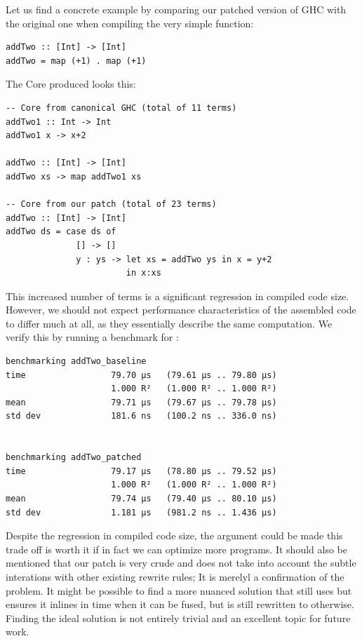 Let us find a concrete example by comparing our patched version of GHC with the original one when compiling the very simple function:

\begin{listing}[H]
\begin{verbatim}
addTwo :: [Int] -> [Int]
addTwo = map (+1) . map (+1)
\end{verbatim}
\end{listing}

The Core produced looks this:

\begin{listing}[H]
\begin{verbatim}
-- Core from canonical GHC (total of 11 terms)
addTwo1 :: Int -> Int
addTwo1 x -> x+2

addTwo :: [Int] -> [Int]
addTwo xs -> map addTwo1 xs

-- Core from our patch (total of 23 terms)
addTwo :: [Int] -> [Int]
addTwo ds = case ds of
              [] -> []
              y : ys -> let xs = addTwo ys in x = y+2
                        in x:xs
\end{verbatim}
\end{listing}

This increased number of terms is a significant regression in compiled code size. 
However, we should not expect performance characteristics of the assembled code to differ much at all,
as they essentially describe the same computation.
We verify this by running a benchmark for :

\begin{listing}[H]
\begin{verbatim}
benchmarking addTwo_baseline
time                 79.70 μs   (79.61 μs .. 79.80 μs)
                     1.000 R²   (1.000 R² .. 1.000 R²)
mean                 79.71 μs   (79.67 μs .. 79.78 μs)
std dev              181.6 ns   (100.2 ns .. 336.0 ns)


benchmarking addTwo_patched
time                 79.17 μs   (78.80 μs .. 79.52 μs)
                     1.000 R²   (1.000 R² .. 1.000 R²)
mean                 79.74 μs   (79.40 μs .. 80.10 μs)
std dev              1.181 μs   (981.2 ns .. 1.436 μs)
\end{verbatim}
\end{listing}

Despite the regression in compiled code size, the argument could be made this trade off is worth it if in fact we can optimize more programs.
It should also be mentioned that our patch is very crude and does not take into account the subtle
interations with other existing rewrite rules; It is merelyl a confirmation of the problem.
It might be possible to find a more nuanced solution that still uses  but ensures it inlines
in time when it can be fused, but is still rewritten to  otherwise.
Finding the ideal solution is not entirely trivial and an excellent topic for future work.

